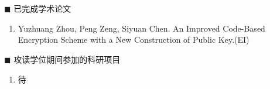 \newpage
\section*{}
\vskip 5mm

\renewcommand{\labelenumi}{[\arabic{enumi}]}
{\heiti $\blacksquare$ 已完成学术论文}

\begin{enumerate}
	\item Yuzhuang Zhou, Peng Zeng, Siyuan Chen. An Improved Code-Based Encryption Scheme with a New Construction of Public Key.(EI)
\end{enumerate}

\renewcommand{\labelenumi}{[\arabic{enumi}]}
{\heiti $\blacksquare$ 攻读学位期间参加的科研项目}
\begin{enumerate}
	\item 待
\end{enumerate}